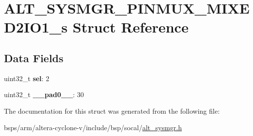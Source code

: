 \hypertarget{structALT__SYSMGR__PINMUX__MIXED2IO1__s}{}\section{A\+L\+T\+\_\+\+S\+Y\+S\+M\+G\+R\+\_\+\+P\+I\+N\+M\+U\+X\+\_\+\+M\+I\+X\+E\+D2\+I\+O1\+\_\+s Struct Reference}
\label{structALT__SYSMGR__PINMUX__MIXED2IO1__s}
\subsection*{Data Fields}
\begin{DoxyCompactItemize}
\item 
\mbox{\label{structALT__SYSMGR__PINMUX__MIXED2IO1__s_adf8caf4381cca69d067794a9a48e2b80}} 
uint32\+\_\+t {\bfseries sel}\+: 2
\item 
\mbox{\label{structALT__SYSMGR__PINMUX__MIXED2IO1__s_ad25744aa02e6a39e033b14a0b5cf8fd8}} 
uint32\+\_\+t {\bfseries \+\_\+\+\_\+pad0\+\_\+\+\_\+}\+: 30
\end{DoxyCompactItemize}


The documentation for this struct was generated from the following file\+:\begin{DoxyCompactItemize}
\item 
bsps/arm/altera-\/cyclone-\/v/include/bsp/socal/\mbox{\hyperlink{alt__sysmgr_8h}{alt\+\_\+sysmgr.\+h}}\end{DoxyCompactItemize}
